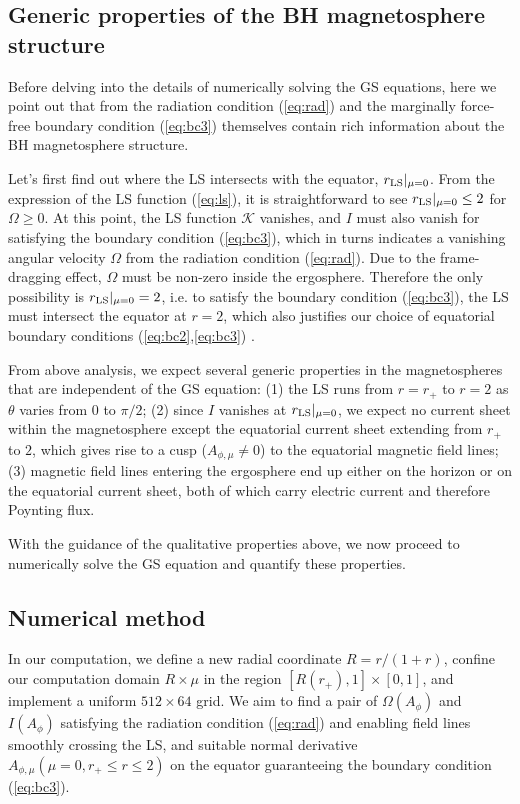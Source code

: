 \documentclass[aps,prd,reprint,nofootinbib, superscriptaddress]{revtex4-1}
\def\Am{A_{\phi,\mu}}
\begin{document}
\subsection{Generic properties of the BH magnetosphere structure}
\label{subsec:features}
Before delving into the details of numerically solving the GS equations,
here we point out that from the radiation condition (\ref{eq:rad}) and the marginally
force-free boundary condition (\ref{eq:bc3})
themselves contain rich information about the BH magnetosphere structure.

Let's first find out where the LS intersects with the equator, $r_{\rm LS}|_{\mu=0}$.
From the expression of the LS function (\ref{eq:ls}), it is straightforward to see $ r_{\rm LS}|_{\mu=0} \leq 2$ for $\Omega \geq 0$.
At this point,  the LS function $\mathcal K$ vanishes,
and $I$ must also vanish for satisfying the boundary condition (\ref{eq:bc3}),
which in turns indicates a vanishing angular velocity $\Omega$ from
the radiation condition (\ref{eq:rad}).  Due to the frame-dragging effect, $\Omega$
must be non-zero inside the ergosphere.  Therefore the only possibility is  $r_{\rm LS}|_{\mu=0} = 2$, i.e.
to satisfy the boundary condition (\ref{eq:bc3}), the LS must intersect the equator at $r=2$, which also
justifies our choice of equatorial boundary conditions (\ref{eq:bc2},\ref{eq:bc3}) .

From above analysis, we expect several generic properties in the magnetospheres that are independent
of the GS equation:
(1) the LS runs from $r=r_+$ to $r=2$ as $\theta$ varies from $0$ to $\pi/2$;
(2) since $I$ vanishes at $r_{\rm LS}|_{\mu=0}$, we expect no current sheet within the magnetosphere except the equatorial current
sheet extending from $r_+$ to $2$, which gives rise to a cusp ($\Am \neq 0$) to the equatorial magnetic field lines;
(3) magnetic field lines entering the ergosphere end up either on the horizon or on the equatorial current sheet,
both of which carry electric current and therefore Poynting flux.

With the guidance of the qualitative properties above, we now proceed to numerically
solve the GS equation and quantify these properties.

\subsection{Numerical method}
\label{subsec:algorithm}

In our computation, we define a new radial coordinate $R=r/(1+r)$, confine our
computation domain $R\times \mu$ in the region $[R(r_+), 1]\times [0,1]$,
and implement a uniform $512\times 64$ grid.
We aim to find a pair of $\Omega(A_\phi)$ and $I(A_\phi)$ satisfying the radiation condition (\ref{eq:rad})
and enabling field lines smoothly crossing the LS,
and suitable normal derivative $\Am(\mu =0, r_+\leq r \leq 2)$ on the equator
guaranteeing the boundary condition (\ref{eq:bc3}).
\end{document}
